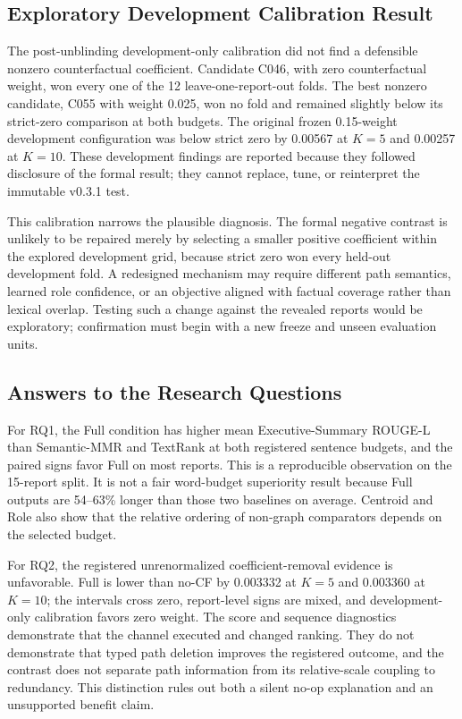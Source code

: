 \documentclass[applsci,article,submit,moreauthors]{Definitions/mdpi}
\begin{document}
\subsection{Exploratory Development Calibration Result}

The post-unblinding development-only calibration did not find a defensible nonzero counterfactual coefficient. Candidate C046, with zero counterfactual weight, won every one of the 12 leave-one-report-out folds. The best nonzero candidate, C055 with weight 0.025, won no fold and remained slightly below its strict-zero comparison at both budgets. The original frozen 0.15-weight development configuration was below strict zero by 0.00567 at $K=5$ and 0.00257 at $K=10$. These development findings are reported because they followed disclosure of the formal result; they cannot replace, tune, or reinterpret the immutable v0.3.1 test.

This calibration narrows the plausible diagnosis. The formal negative contrast is unlikely to be repaired merely by selecting a smaller positive coefficient within the explored development grid, because strict zero won every held-out development fold. A redesigned mechanism may require different path semantics, learned role confidence, or an objective aligned with factual coverage rather than lexical overlap. Testing such a change against the revealed reports would be exploratory; confirmation must begin with a new freeze and unseen evaluation units.

\subsection{Answers to the Research Questions}

For RQ1, the Full condition has higher mean Executive-Summary ROUGE-L than Semantic-MMR and TextRank at both registered sentence budgets, and the paired signs favor Full on most reports. This is a reproducible observation on the 15-report split. It is not a fair word-budget superiority result because Full outputs are 54--63\% longer than those two baselines on average. Centroid and Role also show that the relative ordering of non-graph comparators depends on the selected budget.

For RQ2, the registered unrenormalized coefficient-removal evidence is unfavorable. Full is lower than no-CF by 0.003332 at $K=5$ and 0.003360 at $K=10$; the intervals cross zero, report-level signs are mixed, and development-only calibration favors zero weight. The score and sequence diagnostics demonstrate that the channel executed and changed ranking. They do not demonstrate that typed path deletion improves the registered outcome, and the contrast does not separate path information from its relative-scale coupling to redundancy. This distinction rules out both a silent no-op explanation and an unsupported benefit claim.
\end{document}
